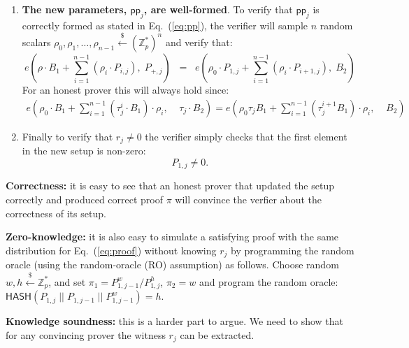 \documentclass{article}
\newcommand{\pp}{\mathsf{pp}}
\newcommand{\sample}{\stackrel{\$}{\gets}}
\begin{document}
\begin{enumerate}
    \item \textbf{The new parameters, $\pp_j$, are well-formed}. To verify that $\pp_j$ is correctly formed as stated in Eq.~(\ref{eq:pp}), the verifier will sample $n$ random scalars $\rho_0, \rho_1, \ldots, \rho_{n-1} \sample \left(\mathbb{Z}^*_p\right)^n$ and verify that:
    \begin{equation}
        e(\rho \cdot B_1 + \sum_{i=1}^{n-1}(\rho_i \cdot P_{i, j}),\; P_{+, j})\;\; =\;\;
        e(\rho_0 \cdot P_{1, j} + \sum_{i=1}^{n-1}(\rho_i \cdot P_{i+1, j}),\; B_2)\label{eq::e}
    \end{equation}
    For an honest prover this will always hold since:
    \begin{align*}
        e\left(\rho_0 \cdot B_1 + \sum_{i=1}^{n-1}\left(\tau_j^i \cdot B_1\right)\cdot {\rho_i},\;\;\;\; \tau_j \cdot B_2\right) =
        e\left({\rho_0 \tau_j} B_1 + \sum_{i=1}^{n-1}\left({\tau_j^{i+1}} B_1\right)\cdot {\rho_i},\;\;\;\; B_2\right)
    \end{align*}
    \item Finally to verify that $r_j \neq 0$ the verifier simply checks that the first element in the new setup is non-zero:
    \begin{equation}
        P_{1, j} \neq 0.
    \end{equation}
\end{enumerate}

\textbf{Correctness:} it is easy to see that an honest prover that updated the setup correctly and produced correct proof $\pi$ will convince the verfier about the correctness of its setup.

\textbf{Zero-knowledge:} it is also easy to simulate a satisfying proof with the same distribution for Eq.~(\ref{eq:proof}) without knowing $r_j$ by programming the random oracle (using the random-oracle (RO) assumption) as follows. Choose random $w, h \xleftarrow{\$} \mathbb{Z}^*_p$, and set $\pi_1 = P_{1, j-1}^w / P_{1, j}^h$, $\pi_2 = w$ and program the random oracle: $\textsf{HASH}(P_{1, j}\;||\;P_{1, j-1}\;||\; P_{1, j-1}^w) = h$.

\textbf{Knowledge soundness:} this is a harder part to argue.
We need to show that for any convincing prover the witness $r_j$ can be extracted.
\end{document}
